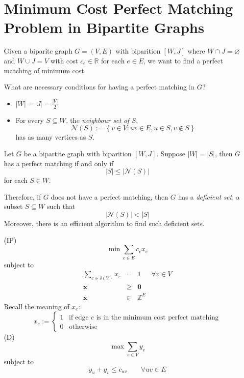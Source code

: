 \section{Minimum Cost Perfect Matching Problem in Bipartite Graphs}
Given a biparite graph $ G=(V,E) $ with biparition $ [W,J] $ where
$ W\cap J = \varnothing $ and $ W\cup J = V $
with cost $ c_e\in\mathbb{R} $ for each $ e\in E $, we want to find
a perfect matching of minimum cost.

What are necessary conditions for having a perfect matching in $ G $?
\begin{itemize}
    \item $ |W|=|J|=\frac{|V|}{2} $
    \item For every $ S\subseteq W $, the \emph{neighbour set of $ S $},
          \[ \mathcal{N}(S):=\left\{ v\in V : uv\in E, u\in S, v\notin S\right\} \]
          has as many vertices as $ S $.
\end{itemize}

\begin{thmbox}
    \begin{theorem}
        Let $ G $ be a bipartite graph with biparition $ [W,J] $.
        Suppose $ |W|=|S| $, then $ G $ has a perfect matching if and only if
        \[ |S|\leqslant |\mathcal{N}(S)| \]
        for each $ S\in W $.
    \end{theorem}
\end{thmbox}
Therefore, if $ G $ does not have a perfect matching, then $ G $
has a \emph{deficient set}; a subset $ S\subseteq W $ such that
\[ |\mathcal{N}(S)|<|S| \]
Moreover, there is an efficient algorithm to find such deficient sets.

(IP)
\[ \min \sum\limits_{e\in E}c_ex_e \]
subject to
\[
    \begin{array}{cccc}
        \sum\limits_{e\in \delta(V)}x_e & =         & 1            & \forall v\in V \\
        \bm{x}                          & \geqslant & \bm{0}                        \\
        \bm{x}                          & \in       & \mathbb{Z}^E
    \end{array} \]
Recall the meaning of $ x_e $:
\[ x_e:=
\begin{cases}
    1 & \text{if edge $e$ is in the minimum cost perfect matching}\\
    0 & \text{otherwise}
\end{cases} \]
(D)
\[ \max \sum\limits_{v\in V}y_v  \]
subject to
\[ y_u+y_v\leqslant c_{uv}\qquad \forall uv\in E \]

